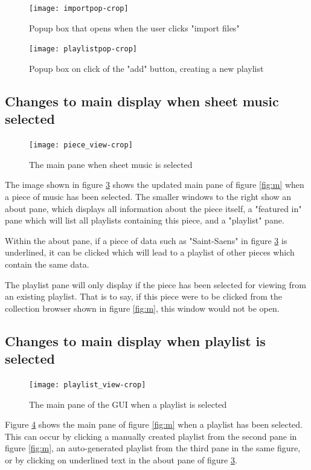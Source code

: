 \begin{appendices}
\begin{figure}[H]
\centering
\texttt{[image: importpop-crop]}
\caption[width=120pt]{Popup box that opens when the user clicks "import files"}	
\label{fig:import}
\end{figure}
\begin{figure}[H]
\centering
\texttt{[image: playlistpop-crop]}
\caption{Popup box on click of the "add" button, creating a new playlist}	
\label{fig:plus}
\end{figure}

\subsection{Changes to main display when sheet music selected}
\begin{figure}[H]
	\centering
	\texttt{[image: piece\_view-crop]}
	\caption{The main pane when sheet music is selected}
	\label{fig:sheet}	
\end{figure}
The image shown in figure \ref{fig:sheet} shows the updated main pane of figure \ref{fig:m} when a piece of music has been selected. The smaller windows to the right show an about pane, which displays all information about the piece itself, a "featured in" pane which will list all playlists containing this piece, and a "playlist" pane. 

Within the about pane, if a piece of data such as "Saint-Saens" in figure \ref{fig:sheet} is underlined, it can be clicked which will lead to a playlist of other pieces which contain the same data.

The playlist pane will only display if the piece has been selected for viewing from an existing playlist. That is to say, if this piece were to be clicked from the collection browser shown in figure \ref{fig:m}, this window would not be open.


\subsection{Changes to main display when playlist is selected}
\begin{figure}[H]
	\texttt{[image: playlist\_view-crop]}
	\caption{The main pane of the GUI when a playlist is selected}
	\label{fig:playlist}
\end{figure}
Figure \ref{fig:playlist} shows the main pane of figure \ref{fig:m} when a playlist has been selected. This can occur by clicking a manually created playlist from the second pane in figure \ref{fig:m}, an auto-generated playlist from the third pane in the same figure, or by clicking on underlined text in the about pane of figure \ref{fig:sheet}.


\end{appendices}
